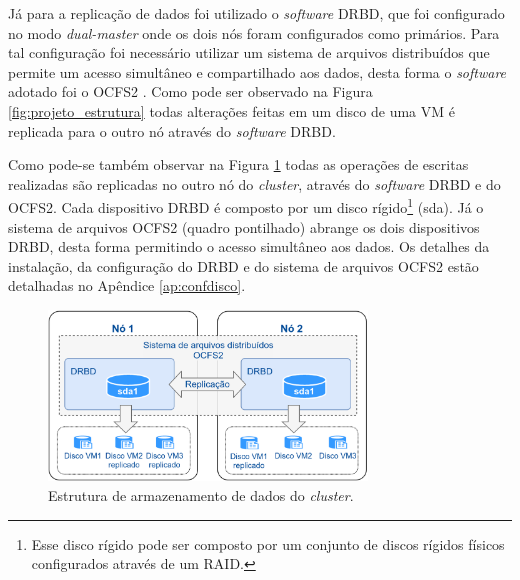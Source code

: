 \newpage
Já para a replicação de dados foi utilizado o \textit{software} \ac{DRBD}, que foi configurado no modo \textit{dual-master} onde os dois nós 
foram configurados como primários. Para tal configuração foi necessário utilizar um sistema de arquivos distribuídos que permite um acesso 
simultâneo e compartilhado aos dados, desta forma o \textit{software} adotado foi o \ac{OCFS2} \cite{ocfs2}. 
Como pode ser observado na Figura \ref{fig:projeto_estrutura} todas alterações feitas em um disco de uma \ac{VM} é replicada para o 
outro nó através do \textit{software} \ac{DRBD}. 

Como pode-se também observar na Figura \ref{fig:projeto_discos} todas as operações de escritas realizadas são replicadas no outro nó do
\textit{cluster}, através do \textit{software} \ac{DRBD} e do \ac{OCFS2}. Cada dispositivo \ac{DRBD} é composto por um disco 
rígido\footnote[1]{Esse disco rígido pode ser composto por um conjunto de discos rígidos físicos configurados através de um \ac{RAID}.} 
(sda). Já o sistema de arquivos \ac{OCFS2} (quadro pontilhado) abrange os dois dispositivos \ac{DRBD}, desta forma permitindo o acesso simultâneo aos dados. 
Os detalhes da instalação, da configuração do \ac{DRBD} e do sistema de arquivos \ac{OCFS2} estão detalhadas no Apêndice \ref{ap:confdisco}. 

\begin{figure}[h!]
 \centering
 \includegraphics[width=320px]{img/projeto_discos.eps}
 \caption{Estrutura de armazenamento de dados do \textit{cluster}.}
 \label{fig:projeto_discos}
\end{figure}

